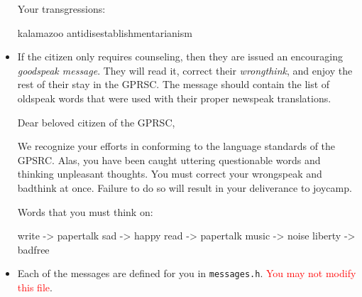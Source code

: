 \begin{itemize}
\begin{shlisting}{}
Your transgressions:

kalamazoo
antidisestablishmentarianism\end{shlisting}

  \item If the citizen only requires counseling, then they are issued an
    encouraging \emph{goodspeak message}. They will read it, correct
    their \emph{wrongthink}, and enjoy the rest of their stay in the
    GPRSC. The message should contain the list of oldspeak words that
    were used with their proper newspeak translations.

    \begin{shlisting}{}
Dear beloved citizen of the GPRSC,

We recognize your efforts in conforming to the language standards
of the GPSRC. Alas, you have been caught uttering questionable words
and thinking unpleasant thoughts. You must correct your wrongspeak
and badthink at once. Failure to do so will result in your deliverance
to joycamp.

Words that you must think on:

write -> papertalk
sad -> happy
read -> papertalk
music -> noise
liberty -> badfree\end{shlisting}

  \item Each of the messages are defined for you in \texttt{messages.h}.
    \textcolor{red}{You may not modify this file}.


\end{itemize}
